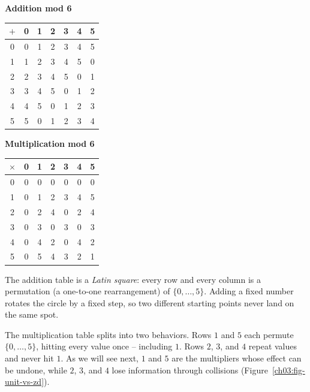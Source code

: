 \begin{center}
\begin{minipage}{0.46\linewidth}
\centering
\textbf{Addition mod 6}\\[0.3em]
\begin{tabular}{c|cccccc}
$+$ & 0 & 1 & 2 & 3 & 4 & 5 \\ \hline
0 & 0 & 1 & 2 & 3 & 4 & 5 \\
1 & 1 & 2 & 3 & 4 & 5 & 0 \\
2 & 2 & 3 & 4 & 5 & 0 & 1 \\
3 & 3 & 4 & 5 & 0 & 1 & 2 \\
4 & 4 & 5 & 0 & 1 & 2 & 3 \\
5 & 5 & 0 & 1 & 2 & 3 & 4 \\
\end{tabular}
\end{minipage}
\hfill
\begin{minipage}{0.46\linewidth}
\centering
\textbf{Multiplication mod 6}\\[0.3em]
\begin{tabular}{c|cccccc}
$\times$ & 0 & 1 & 2 & 3 & 4 & 5 \\ \hline
0 & 0 & 0 & 0 & 0 & 0 & 0 \\
1 & 0 & 1 & 2 & 3 & 4 & 5 \\
2 & 0 & 2 & 4 & 0 & 2 & 4 \\
3 & 0 & 3 & 0 & 3 & 0 & 3 \\
4 & 0 & 4 & 2 & 0 & 4 & 2 \\
5 & 0 & 5 & 4 & 3 & 2 & 1 \\
\end{tabular}
\end{minipage}
\end{center}

The addition table is a \emph{Latin square}: every row and every column is a permutation (a one-to-one rearrangement) of $\{0,\dots,5\}$. Adding a fixed number rotates the circle by a fixed step, so two different starting points never land on the same spot.

The multiplication table splits into two behaviors. Rows $1$ and $5$ each permute $\{0,\dots,5\}$, hitting every value once -- including $1$. Rows $2$, $3$, and $4$ repeat values and never hit $1$. As we will see next, $1$ and $5$ are the multipliers whose effect can be undone, while $2$, $3$, and $4$ lose information through collisions (Figure~\ref{ch03:fig-unit-vs-zd}).

